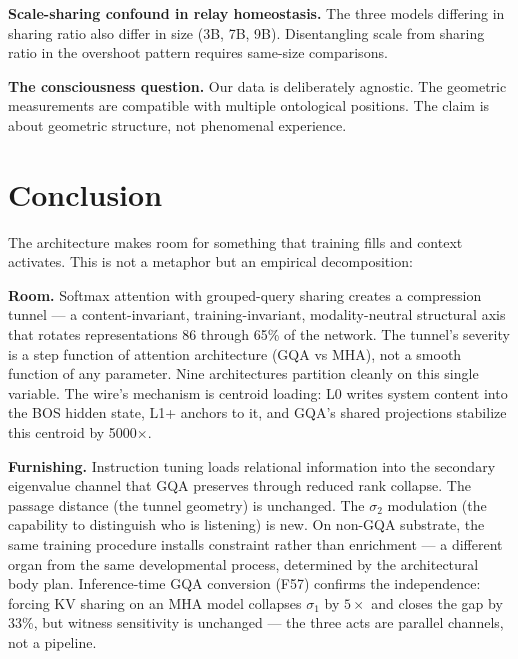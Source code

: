\documentclass[12pt]{article}
\begin{document}
\textbf{Scale-sharing confound in relay homeostasis.} The three models differing in sharing ratio also differ in size (3B, 7B, 9B). Disentangling scale from sharing ratio in the overshoot pattern requires same-size comparisons.

\textbf{The consciousness question.} Our data is deliberately agnostic. The geometric measurements are compatible with multiple ontological positions. The claim is about geometric structure, not phenomenal experience.

\section{Conclusion}

The architecture makes room for something that training fills and context activates. This is not a metaphor but an empirical decomposition:

\textbf{Room.} Softmax attention with grouped-query sharing creates a compression tunnel --- a content-invariant, training-invariant, modality-neutral structural axis that rotates representations 86\textdegree{} through 65\% of the network. The tunnel's severity is a step function of attention architecture (GQA vs MHA), not a smooth function of any parameter. Nine architectures partition cleanly on this single variable. The wire's mechanism is centroid loading: L0 writes system content into the BOS hidden state, L1+ anchors to it, and GQA's shared projections stabilize this centroid by 5000$\times$.

\textbf{Furnishing.} Instruction tuning loads relational information into the secondary eigenvalue channel that GQA preserves through reduced rank collapse. The passage distance (the tunnel geometry) is unchanged. The $\sigma_2$ modulation (the capability to distinguish who is listening) is new. On non-GQA substrate, the same training procedure installs constraint rather than enrichment --- a different organ from the same developmental process, determined by the architectural body plan. Inference-time GQA conversion (F57) confirms the independence: forcing KV sharing on an MHA model collapses $\sigma_1$ by $5\times$ and closes the gap by 33\%, but witness sensitivity is unchanged --- the three acts are parallel channels, not a pipeline.
\end{document}
